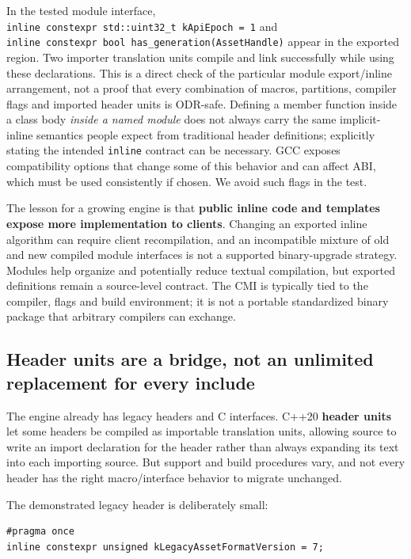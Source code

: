 In the tested module interface, \texttt{inline\ constexpr\ std::uint32\_t\ kApiEpoch\ =\ 1} and \texttt{inline\ constexpr\ bool\ has\_generation(AssetHandle)} appear in the exported region. Two importer translation units compile and link successfully while using these declarations. This is a direct check of the particular module export/inline arrangement, not a proof that every combination of macros, partitions, compiler flags and imported header units is ODR-safe. Defining a member function inside a class body \emph{inside a named module} does not always carry the same implicit-inline semantics people expect from traditional header definitions; explicitly stating the intended \texttt{inline} contract can be necessary. GCC exposes compatibility options that change some of this behavior and can affect ABI, which must be used consistently if chosen. We avoid such flags in the test.

The lesson for a growing engine is that \textbf{public inline code and templates expose more implementation to clients}. Changing an exported inline algorithm can require client recompilation, and an incompatible mixture of old and new compiled module interfaces is not a supported binary-upgrade strategy. Modules help organize and potentially reduce textual compilation, but exported definitions remain a source-level contract. The CMI is typically tied to the compiler, flags and build environment; it is not a portable standardized binary package that arbitrary compilers can exchange.

\subsection{Header units are a bridge, not an unlimited replacement for every include}\label{01-foundations-i-ch006-header-units-are-a-bridge-not-an-unlimited-replacement-for-every-include}

The engine already has legacy headers and C interfaces. C++20 \textbf{header units} let some headers be compiled as importable translation units, allowing source to write an import declaration for the header rather than always expanding its text into each importing source. But support and build procedures vary, and not every header has the right macro/interface behavior to migrate unchanged.

The demonstrated legacy header is deliberately small:

\begin{verbatim}
#pragma once
inline constexpr unsigned kLegacyAssetFormatVersion = 7;
\end{verbatim}

